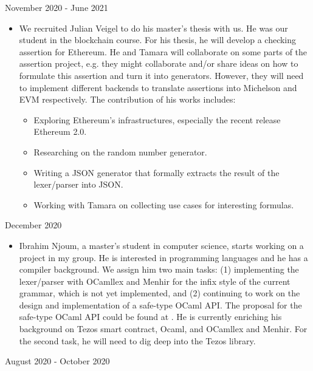 \documentclass[a4paper,11pt]{article}
\begin{document}
November 2020 - June 2021
\begin{itemize}
\item We recruited Julian Veigel to do his master's thesis with us. He was our student in the blockchain course. For his thesis, he will develop a checking assertion for Ethereum.  He and Tamara will collaborate on some parts of the assertion project, e.g. they might collaborate and/or share ideas on how to formulate this assertion and turn it into generators. However, they will need to implement different backends to translate assertions into Michelson and EVM respectively. The contribution of his works includes: 
\begin{itemize}
\item Exploring Ethereum's infrastructures, especially the recent release Ethereum 2.0.
\item Researching on the random number generator.
\item Writing a JSON generator that formally extracts the result of the lexer/parser into JSON. 
\item Working with Tamara on collecting use cases for interesting formulas.
\end{itemize}
\end{itemize}
December 2020 
\begin{itemize}
\item Ibrahim Njoum, a master's student in computer science, starts working on a project in my group. He is interested in programming languages and he has a compiler background. We assign him two main tasks: (1) implementing the lexer/parser with OCamllex and Menhir for the infix style of the current grammar, which is not yet implemented, and (2) continuing to work on the design and implementation of a safe-type OCaml API. The proposal for the safe-type OCaml API could be found at . He is currently enriching his background on Tezos smart contract, Ocaml, and OCamllex and Menhir. For the second task, he will need to dig deep into the Tezos library.
\end{itemize}
August 2020 - October 2020
\end{document}

